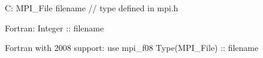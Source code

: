 C:
MPI_File filename // type defined in mpi.h

Fortran:
Integer :: filename

Fortran with 2008 support:
use mpi_f08
Type(MPI_File) :: filename
